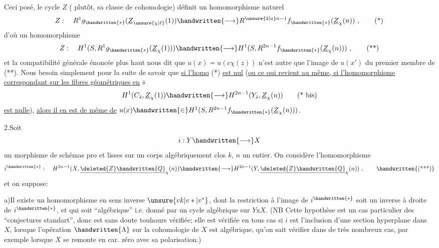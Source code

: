 Ceci posé, le cycle $Z$ ( plutôt, sa classe de cohomologie) définit un homomorphisme naturel
\[
Z:\quad R^1g_{\handwritten{*}}(\underline{Z}_{\unsure{\chi|\ell}}(1))\handwritten{\longrightarrow}R^{\unsure{2|a}n-1}f_{\handwritten{*}}(\underline{Z}_{\chi}(n))\ ,\tag*{(*)}
\]
d'où un homomorphisme
\[
Z:\quad H^1(S,R^1g_{\handwritten{*}}(\underline{Z}_{\chi}(1)))\handwritten{\longrightarrow}H^1(S,R^{2n-1}f_{\handwritten{*}}(\underline{Z}_{\chi}(n)))\ ,\tag*{(**)}
\]
et la compatibilité générale énoncée plus haut nous dit que $u(x)=u(c\chi(z))$ n'est autre que l'image de $u(x')$ du premier membre de  (**). Nous  besoin simplement pour la suite de savoir que \uline{si l'homo} (*) \uline{est nul} (\uline{ou ce qui revient au même, si l'homomorphisme correspondant sur les fibres géométriques en} $\bar s$ 
\[
H^1(C_{\bar s},\underline{Z}_{\chi}(1))\handwritten{\longrightarrow}H^{2n-1}(Y_{\bar s},\underline{Z}_{\chi}(n))\tag*{(* bis)}
\]
\uline{est nulle}), \uline{alors il en est de même de} $u(x)\handwritten{\in}H^1(S,R^{2n-1}f_{\handwritten{*}}(\underline{Z}_{\chi}(n)))$.

2.\quad Soit
\[
i:Y\handwritten{\longrightarrow}X
\]
un morphisme de schémas pro et lisses sur un corps algébriquement clos $k$, $n$ un entier. On  considère l'homomorphisme
\[
i^{\handwritten{*}}:\quad H^{2n-1}(X,\underline{\deleted{Z}\handwritten{Q}}_{\chi}(n))\handwritten{\longrightarrow}H^{2n-1}(Y,\underline{\deleted{Z}\handwritten{Q}}_{\chi}(n))\ ,\tag*{\handwritten{(***)}}
\]
et on suppose:

a)\quad Il existe un homomorphisme en sens inverse $\unsure{vk|v*|v^*}$, dont la restriction à l'image de $i^{\handwritten{*}}$ soit un inverse à droite de $i^{\handwritten{*}}$, et qui soit ``algébrique'' i.e. donné par un cycle algébrique sur $Y\mathbin{\mathrm{x}}X$. (NB Cette hypothèse est un cas particulier des ``conjectures standart'', donc est sans doute touhours vérifiée; elle est vérifiée en tous cas si $i$ est l'inclusion d'une section hyperplane dans $X$, lorsque l'opération $\handwritten{\Lambda}$ sur  la cohomologie de $X$ est algébrique,   qu'on sait vérifier dans de très nombreux cas, par exemple lorsque $X$ se remonte en car. zéro avec sa polarisation.)
